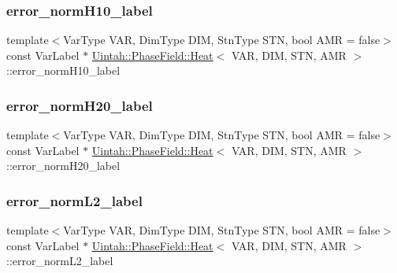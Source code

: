 \subsubsection{\texorpdfstring{error\+\_\+norm\+H10\+\_\+label}{error\_normH10\_label}}
{\footnotesize\ttfamily template$<$Var\+Type V\+AR, Dim\+Type D\+IM, Stn\+Type S\+TN, bool A\+MR = false$>$ \\
const Var\+Label $\ast$ \hyperlink{classUintah_1_1PhaseField_1_1Heat}{Uintah\+::\+Phase\+Field\+::\+Heat}$<$ V\+AR, D\+IM, S\+TN, A\+MR $>$\+::error\+\_\+norm\+H10\+\_\+label\hspace{0.3cm}{\ttfamily [protected]}}

\mbox{\label{classUintah_1_1PhaseField_1_1Heat_ae5fd87bfc6b64d1e72339b4ad860b126}} 
\subsubsection{\texorpdfstring{error\+\_\+norm\+H20\+\_\+label}{error\_normH20\_label}}
{\footnotesize\ttfamily template$<$Var\+Type V\+AR, Dim\+Type D\+IM, Stn\+Type S\+TN, bool A\+MR = false$>$ \\
const Var\+Label $\ast$ \hyperlink{classUintah_1_1PhaseField_1_1Heat}{Uintah\+::\+Phase\+Field\+::\+Heat}$<$ V\+AR, D\+IM, S\+TN, A\+MR $>$\+::error\+\_\+norm\+H20\+\_\+label\hspace{0.3cm}{\ttfamily [protected]}}

\mbox{\label{classUintah_1_1PhaseField_1_1Heat_a664b5e6adac2b2d4a5a56596d81ee9c2}} 
\subsubsection{\texorpdfstring{error\+\_\+norm\+L2\+\_\+label}{error\_normL2\_label}}
{\footnotesize\ttfamily template$<$Var\+Type V\+AR, Dim\+Type D\+IM, Stn\+Type S\+TN, bool A\+MR = false$>$ \\
const Var\+Label $\ast$ \hyperlink{classUintah_1_1PhaseField_1_1Heat}{Uintah\+::\+Phase\+Field\+::\+Heat}$<$ V\+AR, D\+IM, S\+TN, A\+MR $>$\+::error\+\_\+norm\+L2\+\_\+label\hspace{0.3cm}{\ttfamily [protected]}}

